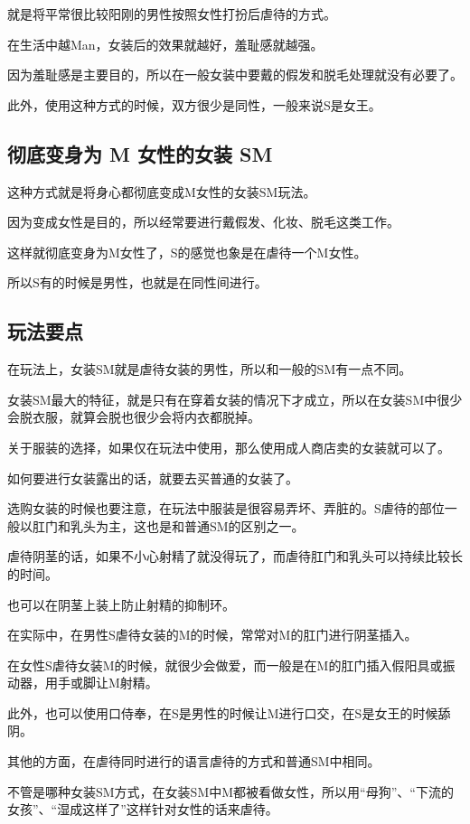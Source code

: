 \documentclass[12pt,UTF8]{ctexbook}
\begin{document}
就是将平常很比较阳刚的男性按照女性打扮后虐待的方式。

在生活中越Man，女装后的效果就越好，羞耻感就越强。

因为羞耻感是主要目的，所以在一般女装中要戴的假发和脱毛处理就没有必要了。

此外，使用这种方式的时候，双方很少是同性，一般来说S是女王。 

\subsection{彻底变身为 M 女性的女装 SM}

这种方式就是将身心都彻底变成M女性的女装SM玩法。

因为变成女性是目的，所以经常要进行戴假发、化妆、脱毛这类工作。

这样就彻底变身为M女性了，S的感觉也象是在虐待一个M女性。

所以S有的时候是男性，也就是在同性间进行。 

\subsection{玩法要点}

在玩法上，女装SM就是虐待女装的男性，所以和一般的SM有一点不同。

女装SM最大的特征，就是只有在穿着女装的情况下才成立，所以在女装SM中很少会脱衣服，就算会脱也很少会将内衣都脱掉。

关于服装的选择，如果仅在玩法中使用，那么使用成人商店卖的女装就可以了。

如何要进行女装露出的话，就要去买普通的女装了。

选购女装的时候也要注意，在玩法中服装是很容易弄坏、弄脏的。S虐待的部位一般以肛门和乳头为主，这也是和普通SM的区别之一。

虐待阴茎的话，如果不小心射精了就没得玩了，而虐待肛门和乳头可以持续比较长的时间。

也可以在阴茎上装上防止射精的抑制环。

在实际中，在男性S虐待女装的M的时候，常常对M的肛门进行阴茎插入。

在女性S虐待女装M的时候，就很少会做爱，而一般是在M的肛门插入假阳具或振动器，用手或脚让M射精。

此外，也可以使用口侍奉，在S是男性的时候让M进行口交，在S是女王的时候舔阴。

其他的方面，在虐待同时进行的语言虐待的方式和普通SM中相同。

不管是哪种女装SM方式，在女装SM中M都被看做女性，所以用“母狗”、“下流的女孩”、“湿成这样了”这样针对女性的话来虐待。
\end{document}
